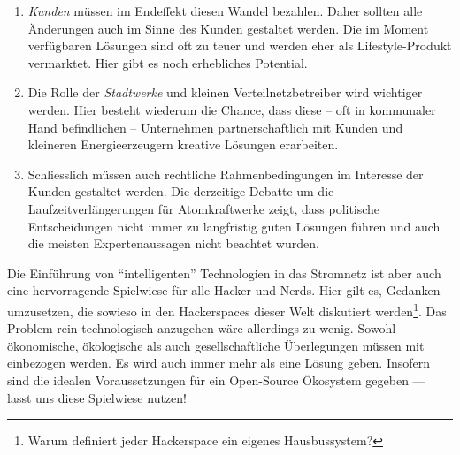 \documentclass[12pt,BCOR=8.5mm]{scrartcl}
\begin{document}
\begin{enumerate}
  \item \emph{Kunden} müssen im Endeffekt diesen Wandel bezahlen. Daher
    sollten alle Änderungen auch im Sinne des Kunden gestaltet werden.
    Die im Moment verfügbaren Lösungen sind oft zu teuer und werden eher
    als Lifestyle-Produkt vermarktet. Hier gibt es noch erhebliches
    Potential.
  \item Die Rolle der \emph{Stadtwerke} und kleinen Verteilnetzbetreiber
    wird wichtiger werden. Hier besteht wiederum die Chance, dass diese
    -- oft in kommunaler Hand befindlichen -- Unternehmen
    partnerschaftlich mit Kunden und kleineren Energieerzeugern kreative
    Lösungen erarbeiten.
  \item Schliesslich müssen auch rechtliche Rahmenbedingungen im
    Interesse der Kunden gestaltet werden. Die derzeitige Debatte um die
    Laufzeitverlängerungen für Atomkraftwerke zeigt, dass politische
    Entscheidungen nicht immer zu langfristig guten Lösungen führen und
    auch die meisten Expertenaussagen nicht beachtet wurden.
\end{enumerate}

Die Einführung von "`intelligenten"' Technologien in das Stromnetz ist
aber auch eine hervorragende Spielwiese für alle Hacker und Nerds.  Hier
gilt es, Gedanken umzusetzen, die sowieso in den Hackerspaces dieser
Welt diskutiert werden\footnote{Warum definiert jeder Hackerspace ein
eigenes Hausbussystem?}. Das Problem rein technologisch anzugehen wäre
allerdings zu wenig. Sowohl ökonomische, ökologische als auch
gesellschaftliche Überlegungen müssen mit einbezogen werden. Es wird
auch immer mehr als eine Lösung geben. Insofern sind die idealen
Voraussetzungen für ein Open-Source Ökosystem gegeben --- lasst uns
diese Spielwiese nutzen!



\end{document}
